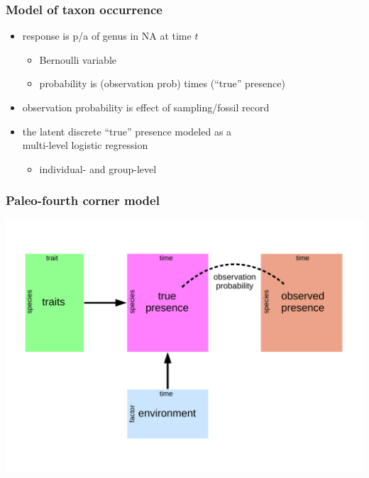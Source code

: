 \documentclass{beamer}
\begin{document}
\begin{frame}
  \frametitle{Model of taxon occurrence}
  \begin{itemize}
    \item response is p/a of genus in NA at time \(t\)
      \begin{itemize}
        \item Bernoulli variable 
        \item probability is (observation prob) times (``true'' presence)
      \end{itemize}
    \item observation probability is effect of sampling/fossil record
    \item the latent discrete ``true'' presence modeled as a \\multi-level logistic regression
      \begin{itemize}
        \item individual- and group-level
      \end{itemize}
  \end{itemize}
\end{frame}

\begin{frame}
  \frametitle{Paleo-fourth corner model}

  \begin{center}
    \includegraphics[height=0.8\textheight,width=\textwidth,keepaspectratio=true]{figure/paleo_fourth_corner}
  \end{center}
\end{frame}
\end{document}

